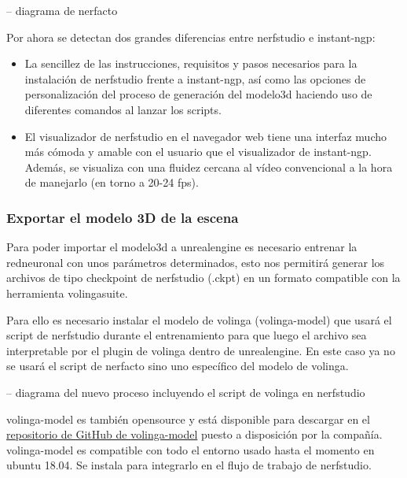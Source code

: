 \documentclass[a4paper, 12pt, spanish, twoside]{article}
\begin{document}
-- diagrama de nerfacto 

Por ahora se detectan dos grandes diferencias entre \gls{nerfstudio} e \gls{instant-ngp}: 

\begin{itemize} 
\item La sencillez de las instrucciones, requisitos y pasos necesarios para la instalación de \gls{nerfstudio} frente a \gls{instant-ngp}, así como las opciones de personalización del proceso de generación del \gls{modelo3d} haciendo uso de diferentes comandos al lanzar los \glspl{script}. 
\item El visualizador de \gls{nerfstudio} en el navegador web tiene una interfaz mucho más cómoda y amable con el usuario que el visualizador de \gls{instant-ngp}. Además, se visualiza con una fluidez cercana al vídeo convencional a la hora de manejarlo (en torno a 20-24 \acrshort{fps}). 
\end{itemize} 

\subsubsection{Exportar el modelo 3D de la escena} \label{sec:implementacion:nerfstudio-volinga:exportar}

Para poder importar el \gls{modelo3d} a \gls{unrealengine} es necesario entrenar la \gls{redneuronal} con unos parámetros determinados, esto nos permitirá generar los archivos de tipo checkpoint de \gls{nerfstudio} (.ckpt) en un formato compatible con la herramienta \gls{volingasuite}. 

Para ello es necesario instalar el modelo de \gls{volinga} (\gls{volinga-model}) que usará el \gls{script} de \gls{nerfstudio}  durante el entrenamiento para que luego el archivo sea interpretable por el \gls{plugin} de \gls{volinga} dentro de \gls{unrealengine}. En este caso ya no se usará el script de \gls{nerfacto} sino uno específico del modelo de \gls{volinga}. 

-- diagrama del nuevo proceso incluyendo el script de volinga en nerfstudio 

\Gls{volinga-model} es también \gls{opensource} y está disponible para descargar en el \href{https://github.com/Volinga/volinga-model}{repositorio de GitHub de \gls{volinga-model}} puesto a disposición por la compañía. \Gls{volinga-model} es compatible con todo el entorno usado hasta el momento en \gls{ubuntu} 18.04. Se instala para integrarlo en el flujo de trabajo de \gls{nerfstudio}. 
\end{document}
